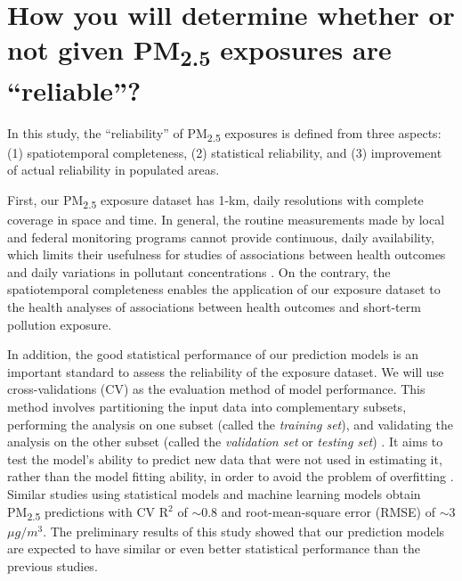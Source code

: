 \documentclass[11pt]{article}
\newcommand{\tsub}{\textsubscript}
\begin{document}
\section{How you will determine whether or not given \texorpdfstring{PM\tsub{2.5}}{PM2.5} exposures are ``reliable''?}
In this study, the ``reliability'' of PM\tsub{2.5} exposures is defined from three aspects: (1) spatiotemporal completeness, (2) statistical reliability, and (3) improvement of actual reliability in populated areas.
\begin{enumerate*}[{[1)]}]
    \item First, our PM\tsub{2.5} exposure dataset has 1-km, daily resolutions with complete coverage in space and time. In general, the routine measurements made by local and federal monitoring programs cannot provide continuous, daily availability, which limits their usefulness for studies of associations between health outcomes and daily variations in pollutant concentrations \citep{sarnat2015fine}. On the contrary, the spatiotemporal completeness enables the application of our exposure dataset to the health analyses of associations between health outcomes and short-term pollution exposure. 
    \item In addition, the good statistical performance of our prediction models is an important standard to assess the reliability of the exposure dataset. We will use cross-validations (CV) as the evaluation method of model performance. This method involves partitioning the input data into complementary subsets, performing the analysis on one subset (called the \textit{training set}), and validating the analysis on the other subset (called the \textit{validation set} or \textit{testing set}) \citep{kohavi1995study}. It aims to test the model's ability to predict new data that were not used in estimating it, rather than the model fitting ability, in order to avoid the problem of overfitting \citep{hawkins2004problem}. Similar studies using statistical models \citep{kloog2011assessing, kloog2014new} and machine learning models \citep{di2016assessing, hu2017estimating} obtain PM\tsub{2.5} predictions with CV R$^2$ of $\sim$0.8 and root-mean-square error (RMSE) of $\sim$3 $\mu g/m^3$. The preliminary results of this study showed that our prediction models are expected to have similar or even better statistical performance than the previous studies. 

\end{enumerate*}
\end{document}

